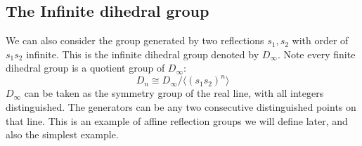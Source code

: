 \documentclass[../main.tex]{subfiles}
\begin{document}
\subsection{The Infinite dihedral group}

We can also consider the group generated by two reflections $s_1,s_2$ with order of $s_1s_2$ infinite. This is the infinite dihedral group denoted by $D_{\infty}$. Note every finite dihedral group is a quotient group of $D_{\infty}$: \[
D_n \cong D_{\infty} / \langle (s_1 s_2)^n \rangle
\]
 $D_{\infty}$ can be taken as the symmetry group of the real line, with all integers distinguished. The generators can be any two consecutive distinguished points on that line. This is an example of affine reflection groups we will define later, and also the simplest example. 

\begin{center}
\end{center}
\end{document}
